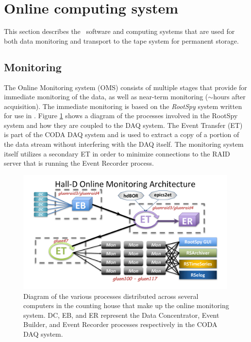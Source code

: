 
\section[Online computing system]{Online computing system \label{sec:online}}

This section describes the \GX ~software and computing systems that are used for both data monitoring and transport to the tape system for permanent storage.

\subsection{Monitoring \label{sec:onlinemonitoring}}

The Online Monitoring system (OMS) consists of multiple stages that provide for immediate monitoring of the data, as well as near-term monitoring ($\sim$hours after acquisition). The immediate monitoring is based on the \textit{RootSpy} system\cite{rootspy} written for use in \GX. Figure \ref{fig:online_monitoring_processes} shows a diagram of the processes involved in the RootSpy system and how they are coupled to the DAQ system. The Event Transfer (ET) is part of the CODA DAQ system\cite{coda} and is used to extract a copy of a portion of the data stream without interfering with the DAQ itself. The monitoring system itself utilizes a secondary ET in order to minimize connections to the RAID server that is running the Event Recorder process.

\begin{figure}[tbp]
\begin{center}
\includegraphics[width=0.99\textwidth, clip,trim=1.5cm 0.9cm 1.7cm 0.8cm]{figures/online_monitoring_processes.pdf}
\caption{\label{fig:online_monitoring_processes}Diagram of the various processes distributed across several computers in the counting house that make up the online monitoring system. DC, EB, and ER represent the Data Concentrator, Event Builder, and Event Recorder processes respectively in the CODA DAQ system.}   
\end{center}  
\end{figure}

